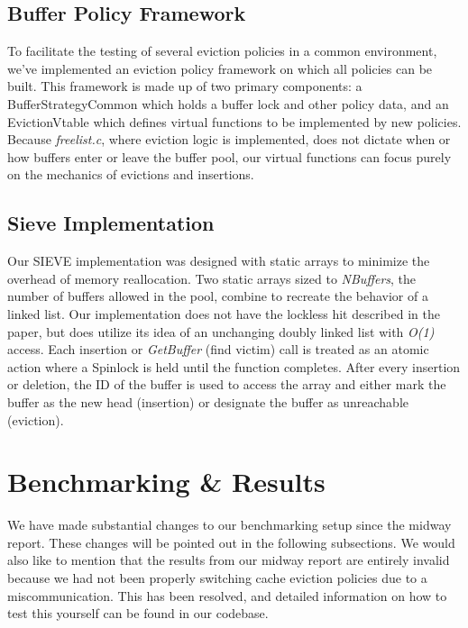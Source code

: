 \documentclass[sigconf]{acmart}
\begin{document}
\subsection{Buffer Policy Framework}

To facilitate the testing of several eviction policies in a common environment, we've implemented an eviction policy framework on which all policies can be built. This framework is made up of two primary components: a BufferStrategyCommon which holds a buffer lock and other policy data, and an EvictionVtable which defines virtual functions to be implemented by new policies. Because \emph{freelist.c}, where eviction logic is implemented, does not dictate when or how buffers enter or leave the buffer pool, our virtual functions can focus purely on the mechanics of evictions and insertions.

\subsection{Sieve Implementation}

Our SIEVE implementation was designed with static arrays to minimize the overhead of memory reallocation. 
Two static arrays sized to \emph{NBuffers}, the number of buffers allowed in the pool, combine to recreate the behavior of a linked list. 
Our implementation does not have the lockless hit described in the paper, but does utilize its idea of an unchanging doubly linked list with \emph{O(1)} access.
Each insertion or \emph{GetBuffer} (find victim) call is treated as an atomic action where a Spinlock is held until the function completes. 
After every insertion or deletion, the ID of the buffer is used to access the array and either mark the buffer as the new head (insertion) or designate the buffer as unreachable (eviction).


\section{Benchmarking \& Results}

We have made substantial changes to our benchmarking setup since the midway report. These changes will be pointed out in the following subsections. We would also like to mention that the results from our midway report are entirely invalid because we had not been properly switching cache eviction policies due to a miscommunication. This has been resolved, and detailed information on how to test this yourself can be found in our codebase.
\end{document}
